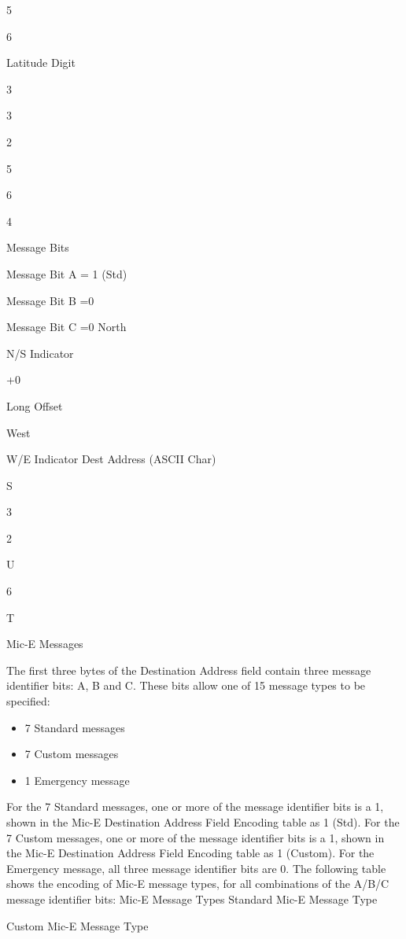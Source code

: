 {{{{{5

6

Latitude Digit

3

3

2

5

6

4

Message Bits

Message
Bit A
= 1 (Std)

Message
Bit B
=0

Message
Bit C
=0
North

N/S Indicator

+0

Long Offset

West

W/E Indicator
Dest Address
(ASCII Char)


S

3

2

U

6

T


Mic-E Messages

The first three bytes of the Destination Address field contain three message
identifier bits: A, B and C. These bits allow one of 15 message types to be
specified:

\begin{itemize}

\item 7 Standard messages
\item 7 Custom messages
\item 1 Emergency message

\end{itemize}

For the 7 Standard messages, one or more of the message identifier bits is a
1, shown in the Mic-E Destination Address Field Encoding table as 1 (Std).
For the 7 Custom messages, one or more of the message identifier bits is a 1,
shown in the Mic-E Destination Address Field Encoding table as 1 (Custom).
For the Emergency message, all three message identifier bits are 0.
The following table shows the encoding of Mic-E message types, for all
combinations of the A/B/C message identifier bits:
Mic-E Message Types
Standard Mic-E
Message Type

Custom Mic-E
Message Type

}}}}}
